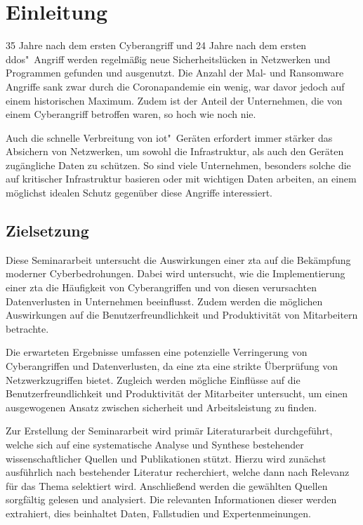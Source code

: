 \section{Einleitung}\label{sec:einleitung}

35 Jahre nach dem ersten Cyberangriff und 24 Jahre nach dem ersten \ac{ddos}"~Angriff werden regelmäßig neue Sicherheitslücken in Netzwerken und Programmen gefunden und ausgenutzt.
Die Anzahl der Mal- und Ransomware Angriffe sank zwar durch die Coronapandemie ein wenig, war davor jedoch auf einem historischen Maximum.\autocites[][]{statista-malware}[][]{statista-ransomware}
Zudem ist der Anteil der Unternehmen, die von einem Cyberangriff betroffen waren, so hoch wie noch nie.\autocite{statista-share-ransomware}

Auch die schnelle Verbreitung von \ac{iot}"~Geräten erfordert immer stärker das Absichern von Netzwerken, um sowohl die Infrastruktur, als auch den Geräten zugängliche Daten zu schützen.\autocite[\vglf][]{syed:2022}
So sind viele Unternehmen, besonders solche die auf kritischer Infrastruktur basieren oder mit wichtigen Daten arbeiten, an einem möglichst idealen Schutz gegenüber diese Angriffe interessiert.

\subsection{Zielsetzung}\label{subsec:zielsetzung}
Diese Seminararbeit untersucht die Auswirkungen einer \ac{zta} auf die Bekämpfung moderner Cyberbedrohungen.
Dabei wird untersucht, wie die Implementierung einer \ac{zta} die Häufigkeit von Cyberangriffen und von diesen verursachten Datenverlusten in Unternehmen beeinflusst.
Zudem werden die möglichen Auswirkungen auf die Benutzerfreundlichkeit und Produktivität von Mitarbeitern betrachte.

Die erwarteten Ergebnisse umfassen eine potenzielle Verringerung von Cyberangriffen und Datenverlusten, da eine \ac{zta} eine strikte Überprüfung von Netzwerkzugriffen bietet.
Zugleich werden mögliche Einflüsse auf die Benutzerfreundlichkeit und Produktivität der Mitarbeiter untersucht, um einen ausgewogenen Ansatz zwischen sicherheit und Arbeitsleistung zu finden.

Zur Erstellung der Seminararbeit wird primär Literaturarbeit durchgeführt, welche sich auf eine systematische Analyse und Synthese bestehender wissenschaftlicher Quellen und Publikationen stützt.
Hierzu wird zunächst ausführlich nach bestehender Literatur recherchiert, welche dann nach Relevanz für das Thema selektiert wird.
Anschließend werden die gewählten Quellen sorgfältig gelesen und analysiert.
Die relevanten Informationen dieser werden extrahiert, dies beinhaltet Daten, Fallstudien und Expertenmeinungen.

